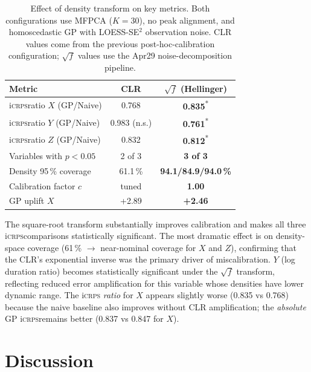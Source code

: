 \documentclass[12pt,a4paper]{article}
\newcommand{\iCRPS}{i\textsc{crps}}
\begin{document}
\begin{table}[htbp]
  \centering
  \caption{Effect of density transform on key metrics.  Both
           configurations use MFPCA ($K=30$), no peak alignment,
           and homoscedastic GP with LOESS-SE$^2$ observation noise.
           CLR values come from the previous post-hoc-calibration
           configuration; $\sqrt{f}$ values use the Apr29
           noise-decomposition pipeline.}
  \label{tab:ablation_transform}
  \begin{tabular}{lcc}
    \toprule
    Metric & CLR & $\sqrt{f}$ (Hellinger) \\
    \midrule
    \iCRPS ratio $X$ (GP/Naive) & 0.768 & \textbf{0.835}\textsuperscript{*} \\
    \iCRPS ratio $Y$ (GP/Naive) & 0.983 (n.s.) & \textbf{0.761}\textsuperscript{*} \\
    \iCRPS ratio $Z$ (GP/Naive) & 0.832 & \textbf{0.812}\textsuperscript{*} \\
    Variables with $p<0.05$     & 2 of 3 & \textbf{3 of 3} \\
    Density 95\,\% coverage     & 61.1\,\% & \textbf{94.1/84.9/94.0\,\%} \\
    Calibration factor $c$      & tuned & \textbf{1.00} \\
    GP uplift $X$               & +2.89 & \textbf{+2.46} \\
    \bottomrule
  \end{tabular}
\end{table}

The square-root transform substantially improves calibration and makes
all three \iCRPS comparisons statistically significant.  The most
dramatic effect is on density-space coverage (61\,\% $\to$
near-nominal coverage for $X$ and $Z$), confirming that the CLR's
exponential inverse was the primary driver of miscalibration.  $Y$
(log duration ratio) becomes statistically significant under the
$\sqrt{f}$ transform, reflecting reduced error amplification for this
variable whose densities have lower dynamic range.  The \iCRPS
\emph{ratio} for $X$ appears slightly worse (0.835 vs 0.768) because
the naive baseline also improves without CLR amplification; the
\emph{absolute} GP \iCRPS remains better (0.837 vs 0.847 for $X$).

\section{Discussion}
\label{sec:discussion}
\end{document}
